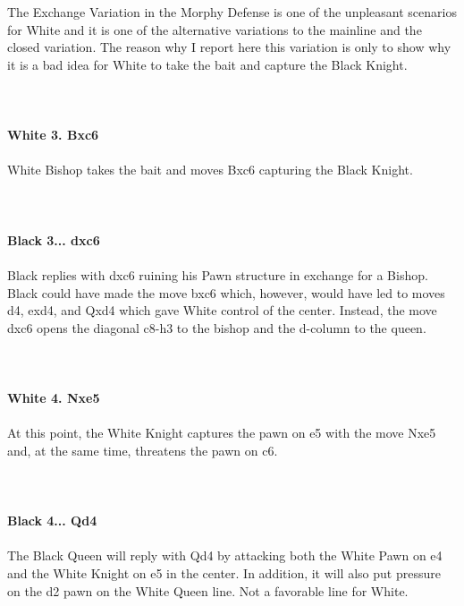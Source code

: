 \documentclass{article}
\begin{document}
The Exchange Variation in the Morphy Defense is one of the unpleasant scenarios for White and it is one of the alternative variations to the mainline and the closed variation. The reason why I report here this variation is only to show why it is a bad idea for White to take the bait and capture the Black Knight.\\
\\

\\
\\
\textbf{White 3. Bxc6}\\
\\
White Bishop takes the bait and moves Bxc6 capturing the Black Knight.\\
\\

\\
\\
\textbf{Black 3... dxc6}\\
\\
Black replies with dxc6 ruining his Pawn structure in exchange for a Bishop. Black could have made the move bxc6 which, however, would have led to moves d4, exd4, and Qxd4 which gave White control of the center. Instead, the move dxc6 opens the diagonal c8-h3 to the bishop and the d-column to the queen.\\
\\

\\
\\
\textbf{White 4. Nxe5}\\
\\
At this point, the White Knight captures the pawn on e5 with the move Nxe5 and, at the same time, threatens the pawn on c6.\\
\\

\\
\\
\textbf{Black 4... Qd4}\\
\\
The Black Queen will reply with Qd4 by attacking both the White Pawn on e4 and the White Knight on e5 in the center. In addition, it will also put pressure on the d2 pawn on the White Queen line. Not a favorable line for White.\\
\\

\\
\\
\end{document}
